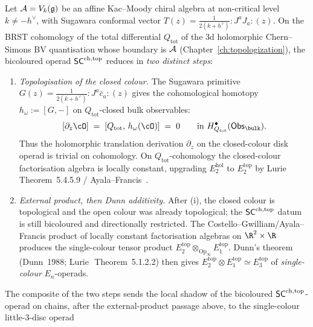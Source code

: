 \begin{theorem}
\label{thm:heptagon-collapse}%
%
%
%

Let $\mathcal{A}=V_k(\mathfrak{g})$ be an affine Kac--Moody chiral algebra at
non-critical level $k\neq -h^{\vee}$, with Sugawara conformal
vector $T(z)=\tfrac{1}{2(k+h^{\vee})}:\!J^aJ_a\!:(z)$. On the
BRST cohomology of the total differential $Q_{\mathrm{tot}}$ of the
$3$d holomorphic Chern--Simons BV quantisation whose boundary is
$\mathcal{A}$ (Chapter~\ref{ch:topologization}), the bicoloured operad
$\mathsf{SC}^{\mathrm{ch},\mathrm{top}}$ reduces in \emph{two distinct steps}:
\begin{enumerate}[label=\textup{(\roman*)}]
 \item \emph{Topologisation of the closed colour.} The Sugawara
 primitive $G(z)=\tfrac{1}{2(k+h^{\vee})}{:}J^a\bar c_a{:}(z)$
 gives the cohomological homotopy \(h_\omega:=[G,-]\) on
 \(Q_{\mathrm{tot}}\)-closed bulk observables:
 \begin{equation}\label{eq:h-omega-coboundary-km}
 [\partial_z\cO]
 \;=\;
 [Q_{\mathrm{tot}},\,h_\omega(\cO)]
 \;=\;0
 \qquad
 \text{in }H^\bullet_{Q_{\mathrm{tot}}}(\Obs_\bulk).
 \end{equation}
 Thus the holomorphic translation derivation $\partial_z$
 on the closed-colour disk operad is trivial on cohomology. On
 $Q_{\mathrm{tot}}$-cohomology the closed-colour factorisation
 algebra is locally constant, upgrading $E_2^{\mathrm{hol}}$ to
 $E_2^{\mathrm{top}}$ by Lurie~\cite{HA}\,Theorem~5.4.5.9 /
 Ayala--Francis~\cite{AF15}.
 \item \emph{External product, then Dunn additivity.} After
 (i), the closed colour is topological and the open colour was
 already topological; the $\mathsf{SC}^{\mathrm{ch},\mathrm{top}}$ datum is still bicoloured and
 directionally restricted. The Costello--Gwilliam/Ayala--Francis
 product of locally constant factorisation algebras on
 $\R^2\times\R$ produces the single-colour tensor product
 $E_2^{\mathrm{top}}\otimes_{\mathrm{Op}_\infty}
 E_1^{\mathrm{top}}$. Dunn's theorem
 (Dunn~1988; Lurie~\cite{HA}\,Theorem~5.1.2.2) then gives
 $E_2^{\mathrm{top}}\otimes E_1^{\mathrm{top}}\simeq
 E_3^{\mathrm{top}}$ of \emph{single-colour}
 $E_n$-operads.
\end{enumerate}
The composite of the two steps sends the local shadow of the
bicoloured $\mathsf{SC}^{\mathrm{ch},\mathrm{top}}$-operad on chains, after the external-product
passage above, to the single-colour little-$3$-disc operad

\end{theorem}
